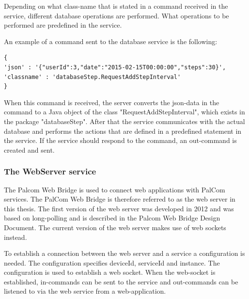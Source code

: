 \documentclass{cslthse-msc}
\begin{document}
Depending on what class-name that is stated in a command received in the service, different database operations are performed. What operations to be performed are predefined in the service. 

An example of a command sent to the database service is the following: 

\begin{verbatim}
{
'json' : '{"userId":3,"date":"2015-02-15T00:00:00","steps":30}',
'classname'	: 'databaseStep.RequestAddStepInterval'
}
\end{verbatim}  

When this command is received, the server converts the json-data in the command to a Java object of the class "RequestAddStepInterval", which exists in the package "databaseStep". After that the service communicates with the actual database and performs the actions that are defined in a predefined statement in the service. If the service should respond to the command, an out-command is created and sent. 

	
\subsubsection{The WebServer service}
\label{sec:webserver}

The Palcom Web Bridge is used to connect web applications with PalCom services.  The PalCom Web Bridge is therefore referred to as the web server in this thesis. The first version of the web server was developed in 2012 and was based on long-polling and is described in the Palcom Web Bridge Design Document\cite{XXXXXXNULL}. The current version of the web server makes use of web sockets instead. 

To establish a connection between the web server and a service a configuration is needed. The configuration specifies deviceId, serviceId and instance. The configuration is used to establish a web socket. When the web-socket is established, in-commands can be sent to the service and out-commands can be listened to via the web service from a web-application.
\end{document}
